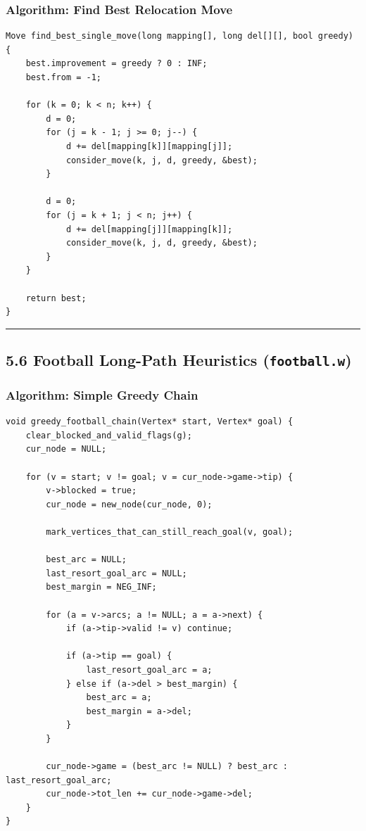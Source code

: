 \documentclass[11pt]{article}
\begin{document}
\subsubsection{Algorithm: Find Best Relocation Move}\label{algorithm-find-best-relocation-move}

\begin{verbatim}
Move find_best_single_move(long mapping[], long del[][], bool greedy) {
    best.improvement = greedy ? 0 : INF;
    best.from = -1;

    for (k = 0; k < n; k++) {
        d = 0;
        for (j = k - 1; j >= 0; j--) {
            d += del[mapping[k]][mapping[j]];
            consider_move(k, j, d, greedy, &best);
        }

        d = 0;
        for (j = k + 1; j < n; j++) {
            d += del[mapping[j]][mapping[k]];
            consider_move(k, j, d, greedy, &best);
        }
    }

    return best;
}
\end{verbatim}

\begin{center}\rule{0.5\linewidth}{0.5pt}\end{center}

\subsection{\texorpdfstring{5.6 Football Long-Path Heuristics (\texttt{football.w})}{5.6 Football Long-Path Heuristics (football.w)}}\label{football-long-path-heuristics-football.w}

\subsubsection{Algorithm: Simple Greedy Chain}\label{algorithm-simple-greedy-chain}

\begin{verbatim}
void greedy_football_chain(Vertex* start, Vertex* goal) {
    clear_blocked_and_valid_flags(g);
    cur_node = NULL;

    for (v = start; v != goal; v = cur_node->game->tip) {
        v->blocked = true;
        cur_node = new_node(cur_node, 0);

        mark_vertices_that_can_still_reach_goal(v, goal);

        best_arc = NULL;
        last_resort_goal_arc = NULL;
        best_margin = NEG_INF;

        for (a = v->arcs; a != NULL; a = a->next) {
            if (a->tip->valid != v) continue;

            if (a->tip == goal) {
                last_resort_goal_arc = a;
            } else if (a->del > best_margin) {
                best_arc = a;
                best_margin = a->del;
            }
        }

        cur_node->game = (best_arc != NULL) ? best_arc : last_resort_goal_arc;
        cur_node->tot_len += cur_node->game->del;
    }
}
\end{verbatim}
\end{document}
